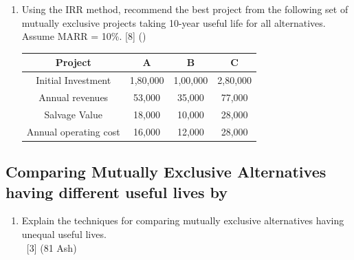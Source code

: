 \documentclass[12pt]{article}
\newcommand{\enter}{\\\textcolor{white}{1}}
\begin{document}
\begin{enumerate}[noitemsep, topsep=0pt]
		\item Using the IRR method, recommend the best project from the following set of mutually exclusive projects taking 10-year useful life for all alternatives. Assume MARR = 10\%. \hfill [8] ()\\
		\begin{tabular}{|c|c|c|c|}
			\hline
			Project & A & B & C \\ \hline
			Initial Investment & 1,80,000 & 1,00,000 & 2,80,000 \\ \hline
			Annual revenues & 53,000 & 35,000 & 77,000 \\ \hline
			Salvage Value & 18,000 & 10,000 & 28,000 \\ \hline
			Annual operating cost & 16,000 & 12,000 & 28,000 \\ \hline
		\end{tabular}
	\end{enumerate}
	\subsection{Comparing Mutually Exclusive Alternatives having different useful lives by}
	\begin{enumerate}[noitemsep, topsep = 0pt]
		\item Explain the techniques for comparing mutually exclusive alternatives having unequal useful lives. 
		\enter\hfill [3] (81 Ash)
	\end{enumerate}
\end{document}

